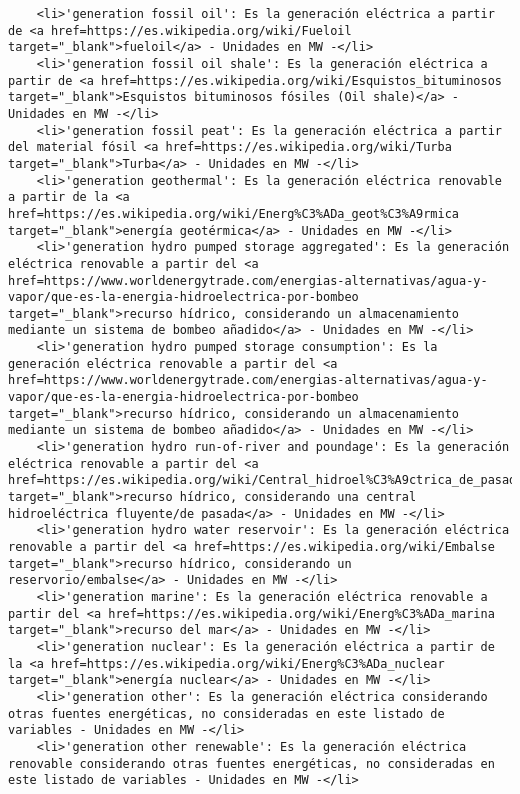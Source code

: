 \documentclass[11pt]{article}
\begin{document}
\begin{verbatim}
    <li>'generation fossil oil': Es la generación eléctrica a partir de <a href=https://es.wikipedia.org/wiki/Fueloil target="_blank">fueloil</a> - Unidades en MW -</li>
    <li>'generation fossil oil shale': Es la generación eléctrica a partir de <a href=https://es.wikipedia.org/wiki/Esquistos_bituminosos target="_blank">Esquistos bituminosos fósiles (Oil shale)</a> - Unidades en MW -</li>
    <li>'generation fossil peat': Es la generación eléctrica a partir del material fósil <a href=https://es.wikipedia.org/wiki/Turba target="_blank">Turba</a> - Unidades en MW -</li>
    <li>'generation geothermal': Es la generación eléctrica renovable a partir de la <a href=https://es.wikipedia.org/wiki/Energ%C3%ADa_geot%C3%A9rmica target="_blank">energía geotérmica</a> - Unidades en MW -</li>
    <li>'generation hydro pumped storage aggregated': Es la generación eléctrica renovable a partir del <a href=https://www.worldenergytrade.com/energias-alternativas/agua-y-vapor/que-es-la-energia-hidroelectrica-por-bombeo target="_blank">recurso hídrico, considerando un almacenamiento mediante un sistema de bombeo añadido</a> - Unidades en MW -</li>
    <li>'generation hydro pumped storage consumption': Es la generación eléctrica renovable a partir del <a href=https://www.worldenergytrade.com/energias-alternativas/agua-y-vapor/que-es-la-energia-hidroelectrica-por-bombeo target="_blank">recurso hídrico, considerando un almacenamiento mediante un sistema de bombeo añadido</a> - Unidades en MW -</li>
    <li>'generation hydro run-of-river and poundage': Es la generación eléctrica renovable a partir del <a href=https://es.wikipedia.org/wiki/Central_hidroel%C3%A9ctrica_de_pasada target="_blank">recurso hídrico, considerando una central hidroeléctrica fluyente/de pasada</a> - Unidades en MW -</li>
    <li>'generation hydro water reservoir': Es la generación eléctrica renovable a partir del <a href=https://es.wikipedia.org/wiki/Embalse target="_blank">recurso hídrico, considerando un reservorio/embalse</a> - Unidades en MW -</li>
    <li>'generation marine': Es la generación eléctrica renovable a partir del <a href=https://es.wikipedia.org/wiki/Energ%C3%ADa_marina target="_blank">recurso del mar</a> - Unidades en MW -</li>
    <li>'generation nuclear': Es la generación eléctrica a partir de la <a href=https://es.wikipedia.org/wiki/Energ%C3%ADa_nuclear target="_blank">energía nuclear</a> - Unidades en MW -</li>
    <li>'generation other': Es la generación eléctrica considerando otras fuentes energéticas, no consideradas en este listado de variables - Unidades en MW -</li>
    <li>'generation other renewable': Es la generación eléctrica renovable considerando otras fuentes energéticas, no consideradas en este listado de variables - Unidades en MW -</li>

\end{verbatim}
\end{document}
